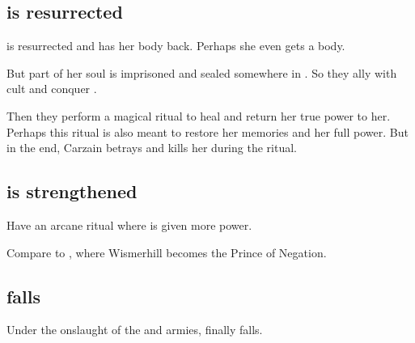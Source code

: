 \subsection{\Belzir is resurrected}
\Belzir{} is resurrected and has her body back. 
Perhaps she even gets a \resvil{} body. 

But part of her soul is imprisoned and sealed somewhere in \Redce. So they ally with  cult and conquer \Redce. 

Then they perform a magical ritual to heal \Belzir{} and return her true power to her.
Perhaps this ritual is also meant to restore her memories and her full \Malach{} power. 
But in the end, Carzain betrays \Belzir{} and kills her during the ritual. 








\subsection{\Vizsherioch{} is strengthened}
Have an arcane ritual where \Vizsherioch{} is given more power. 

Compare to , where Wismerhill becomes the Prince of Negation. 








\subsection{\Redce{} falls}
Under the onslaught of the  and  armies,  finally falls. 

